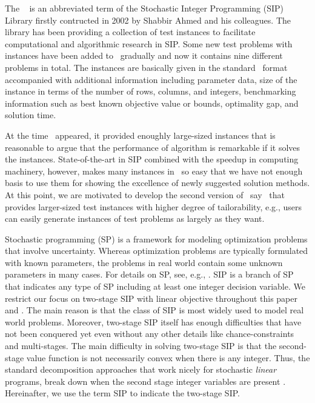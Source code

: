 The \siplib\ \cite{web:SIPLIB1} is an abbreviated term of the Stochastic Integer Programming (SIP) Library firstly contructed in 2002 by Shabbir Ahmed and his colleagues. The library has been providing a collection of test instances to facilitate computational and algorithmic research in SIP. Some new test problems with instances have been added to \siplib\ gradually and now it contains nine different problems in total. The instances are basically given in the standard \smps\ format accompanied with additional information including parameter data, size of the instance in terms of the number of rows, columns, and integers, benchmarking information such as best known objective value or bounds, optimality gap, and solution time.

At the time \siplib\ appeared, it provided enoughly large-sized instances that is reasonable to argue that the performance of algorithm is remarkable if it solves the instances. State-of-the-art in SIP combined with the speedup in computing machinery, however, makes many instances in \siplib\ so easy that we have not enough basis to use them for showing the excellence of newly suggested solution methods. At this point, we are motivated to develop the second version of \siplib\, say \siplibtwo\ that provides larger-sized test instances with higher degree of tailorability, e.g., users can easily generate instances of test problems as largely as they want.%

Stochastic programming (SP) is a framework for modeling optimization problems that involve uncertainty. Whereas optimization problems are typically formulated with known parameters, the problems in real world contain some unknown parameters in many cases. For details on SP, see, e.g., \cite{web:SPS,book:BL2011}. SIP is a branch of SP that indicates any type of SP including at least one integer decision variable. We restrict our focus on two-stage SIP with linear objective throughout this paper and \siplibtwo. The main reason is that the class of SIP is most widely used to model real world problems. Moreover, two-stage SIP itself has enough difficulties that have not been conquered yet even without any other details like chance-constraints and multi-stages. The main difficulty in solving two-stage SIP is that the second-stage value function is not necessarily convex when there is any integer. Thus, the standard decomposition approaches that work nicely for stochastic \textit{linear} programs, break down when the second stage integer variables are present \cite{journal:AG2004}. Hereinafter, we use the term SIP to indicate the two-stage SIP.

